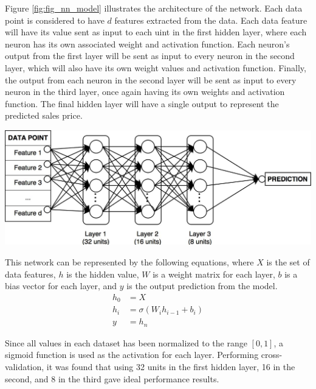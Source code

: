 \documentclass[10pt]{article}
\begin{document}
\begin{multicols}{2}
		Figure \ref{fig:fig_nn_model} illustrates the architecture of the network. Each data point is considered to have \(d\) features extracted from the data. Each data feature will have its value sent as input to each uint in the first hidden layer, where each neuron has its own associated weight and activation function. Each neuron's output from the first layer will be sent as input to every neuron in the second layer, which will also have its own weight values and activation function. Finally, the output from each neuron in the second layer will be sent as input to every neuron in the third layer, once again having its own weights and activation function. The final hidden layer will have a single output to represent the predicted sales price.
		
		\begin{center}
            \captionsetup{type=figure}
			\includegraphics[scale=0.15]{NeuralNet/fig_nn_01} \\
			\label{fig:fig_nn_model}
		\end{center}
	
		This network can be represented by the following equations, where \(X\) is the set of data features, \(h\) is the hidden value, \(W\) is a weight matrix for each layer, \(b\) is a bias vector for each layer, and \(y\) is the output prediction from the model.
		\begin{align}
			h_{0} &= X \nonumber \\
			h_{i} &= \sigma(W_{i}h_{i-1} + b_{i}) \nonumber \\
			y &= h_{n} \nonumber
		\end{align}
	
		Since all values in each dataset has been normalized to the range \([0, 1]\), a sigmoid function is used as the activation for each layer. Performing cross-validation, it was found that using 32 units in the first hidden layer, 16 in the second, and 8 in the third gave ideal performance results.
		

\end{multicols}
\end{document}
